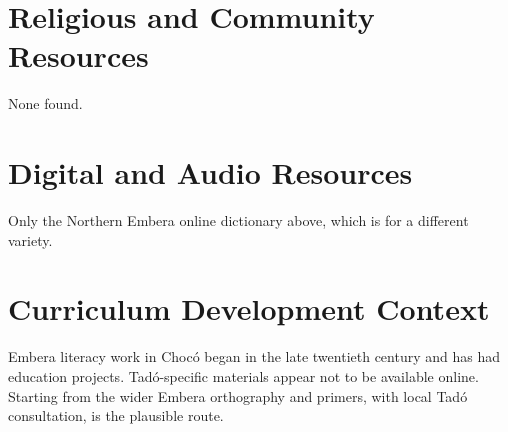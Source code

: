 \documentclass[12pt]{article}
\begin{document}
\section{Religious and Community Resources}
None found.

\section{Digital and Audio Resources}
Only the Northern Embera online dictionary above, which is for a different variety.

\section{Curriculum Development Context}
Embera literacy work in Choc\'o began in the late twentieth century and has had education projects. Tad\'o-specific materials appear not to be available online. Starting from the wider Embera orthography and primers, with local Tad\'o consultation, is the plausible route.
\end{document}
